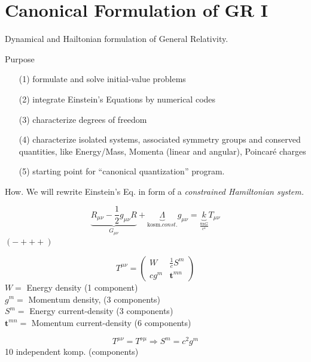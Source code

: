 \documentclass[10pt]{amsart}
\begin{document}
\begin{multicols*}{2}
	\section{}
	
	\section{Canonical Formulation of GR I}
	
	Dynamical and Hailtonian formulation of General Relativity.
	
	Purpose
	\begin{enumerate}
		\item[(1)] formulate and solve initial-value problems
		\item[(2)] integrate Einstein's Equations by numerical codes
		\item[(3)] characterize degrees of freedom
		\item[(4)] characterize isolated systems, associated symmetry groups and conserved quantities, like Energy/Mass, Momenta (linear and angular), Poincar\'e charges
		\item[(5)] starting point for ``canonical quantization'' program.
	\end{enumerate}
	
	How. We will rewrite Einstein's Eq. in form of a \emph{constrained Hamiltonian system.}  
	
	\hrulefill
	
	\[
	\underbrace{R_{\mu \nu} - \frac{1}{2}g_{\mu \nu}R}_{G_{\mu \nu}} + \underbrace{\Lambda}_{\text{kosm.} const.} g_{\mu \nu} = \underbrace{k}_{ \frac{ 8 \pi G}{c^4} } T_{\mu \nu}   
	\]
	$(-+++)$
	
	\[
	T^{\mu \nu} = \left( \begin{matrix} W & \frac{1}{c} S^m \\
	c g^m & \mathbf{t}^{mn} \end{matrix} \right)
	\]
	$W = $ Energy density (1 component)\\
	$g^m =$ Momentum density, (3 components) \\
	$S^m = $ Energy current-density (3 components)\\
	$\mathbf{t}^{mn} = $ Momentum current-density (6 components)
	
	\[
	T^{\mu \nu} = T^{\nu \mu} \Longrightarrow S^m = c^2 g^m
	\]
	10 independent komp. (components)
	

\end{multicols*}
\end{document}
